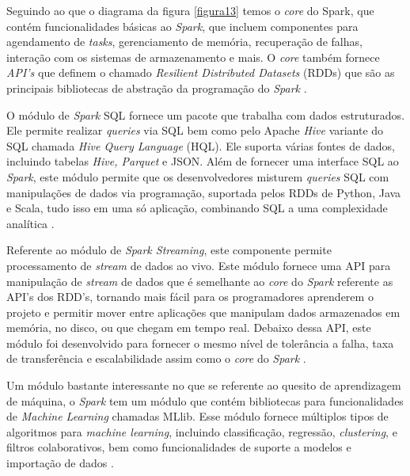             Seguindo ao que o diagrama da figura \ref{figura13} temos o \textit{core} do Spark, que contém funcionalidades
            básicas ao \textit{Spark}, que incluem componentes para agendamento de \textit{tasks}, gerenciamento de
            memória, recuperação de falhas, interação com os sistemas de armazenamento e mais. O \textit{core} também
            fornece \textit{API’s} que definem o chamado \textit{Resilient Distributed Datasets} (RDDs) que são as principais
            bibliotecas de abstração da programação do \textit{Spark} \cite{karau2015}.

            O módulo de \textit{Spark} SQL fornece um pacote que trabalha com dados estruturados. Ele permite realizar
            \textit{queries} via SQL bem como pelo Apache \textit{Hive} variante do SQL chamada \textit{Hive Query Language}
            (HQL). Ele suporta várias fontes de dados, incluindo tabelas \textit{Hive, Parquet} e JSON. Além de fornecer uma
            interface SQL ao \textit{Spark}, este módulo permite que os desenvolvedores misturem \textit{queries} SQL com
            manipulações de dados via programação, suportada pelos RDDs de Python, Java e Scala, tudo isso em uma só aplicação,
            combinando SQL a uma complexidade analítica \cite{karau2015}.

            Referente ao módulo de \textit{Spark Streaming}, este componente permite processamento de \textit{stream} de dados
            ao vivo. Este módulo fornece uma API para manipulação de \textit{stream} de dados que é semelhante ao \textit{core}
            do \textit{Spark} referente as API’s dos RDD’s, tornando mais fácil para os programadores aprenderem o projeto e permitir
            mover entre aplicações que manipulam dados armazenados em memória, no disco, ou que chegam em tempo real. Debaixo
            dessa API, este módulo foi desenvolvido para fornecer o mesmo nível de tolerância a falha, taxa de transferência e
            escalabilidade assim como o \textit{core} do \textit{Spark} \cite{karau2015}.

            Um módulo bastante interessante no que se referente ao quesito de aprendizagem de máquina, o \textit{Spark} tem um
            módulo que contém bibliotecas para funcionalidades de \textit{Machine Learning} chamadas MLlib. Esse módulo fornece
            múltiplos tipos de algoritmos para \textit{machine learning}, incluindo classificação, regressão, \textit{clustering}, e filtros
            colaborativos, bem como funcionalidades de suporte a modelos e importação de dados \cite{karau2015}.

